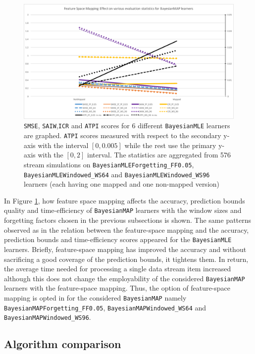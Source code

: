 \begin{figure}[htbp]
  \centering
    \includegraphics[width=\linewidth]{./Figures/fsm_effect_bmap.pdf}
  \caption{\texttt{SMSE}, \texttt{SAIW},\texttt{ICR} and \texttt{ATPI} scores for 6 different \texttt{BayesianMLE} learners are graphed. \texttt{ATPI} scores measured with respect to the secondary y-axis with the interval $[0,0.005]$ while the rest use the primary y-axis with the $[0,2]$ interval. The statistics are aggregated from 576 stream simulations on \texttt{BayesianMLEForgetting\_FF0.05}, \texttt{BayesianMLEWindowed\_WS64} and \texttt{BayesianMLEWindowed\_WS96} learners (each having one mapped and one non-mapped version)}
  \label{fig:fsm_effect_bmap}
\end{figure}

In Figure \ref{fig:fsm_effect_bmap}, how feature space mapping affects the accuracy, prediction bounds quality and time-efficiency of \texttt{BayesianMAP} learners with the window sizes and forgetting factors chosen in the previous subsections is shown. The same patterns observed as in the relation between the feature-space mapping and the accuracy, prediction bounds and time-efficiency scores appeared for the \texttt{BayesianMLE} learners. Briefly, feature-space mapping has improved the accuracy and without sacrificing a good coverage of the prediction bounds, it tightens them. In return, the average time needed for processing a single data stream item increased although this does not change the employability of the considered \texttt{BayesianMAP} learners with the feature-space mapping. Thus, the option of feature-space mapping is opted in for the considered \texttt{BayesianMAP} namely \texttt{BayesianMAPForgetting\_FF0.05}, \texttt{BayesianMAPWindowed\_WS64} and \texttt{BayesianMAPWindowed\_WS96}.

\subsection{Algorithm comparison}

